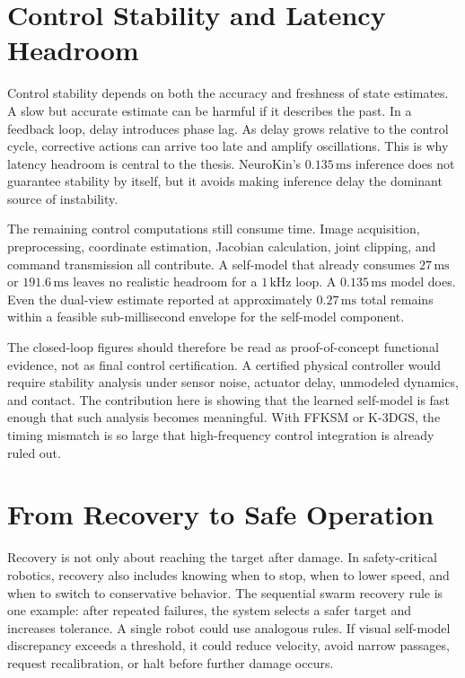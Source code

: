 \documentclass[12pt,a4paper,oneside]{report}
\begin{document}
\section{Control Stability and Latency Headroom}

Control stability depends on both the accuracy and freshness of state estimates. A slow but accurate estimate can be harmful if it describes the past. In a feedback loop, delay introduces phase lag. As delay grows relative to the control cycle, corrective actions can arrive too late and amplify oscillations. This is why latency headroom is central to the thesis. NeuroKin's $0.135\,\mathrm{ms}$ inference does not guarantee stability by itself, but it avoids making inference delay the dominant source of instability.

The remaining control computations still consume time. Image acquisition, preprocessing, coordinate estimation, Jacobian calculation, joint clipping, and command transmission all contribute. A self-model that already consumes $27\,\mathrm{ms}$ or $191.6\,\mathrm{ms}$ leaves no realistic headroom for a $1\,\mathrm{kHz}$ loop. A $0.135\,\mathrm{ms}$ model does. Even the dual-view estimate reported at approximately $0.27\,\mathrm{ms}$ total remains within a feasible sub-millisecond envelope for the self-model component.

The closed-loop figures should therefore be read as proof-of-concept functional evidence, not as final control certification. A certified physical controller would require stability analysis under sensor noise, actuator delay, unmodeled dynamics, and contact. The contribution here is showing that the learned self-model is fast enough that such analysis becomes meaningful. With FFKSM or K-3DGS, the timing mismatch is so large that high-frequency control integration is already ruled out.

\section{From Recovery to Safe Operation}

Recovery is not only about reaching the target after damage. In safety-critical robotics, recovery also includes knowing when to stop, when to lower speed, and when to switch to conservative behavior. The sequential swarm recovery rule is one example: after repeated failures, the system selects a safer target and increases tolerance. A single robot could use analogous rules. If visual self-model discrepancy exceeds a threshold, it could reduce velocity, avoid narrow passages, request recalibration, or halt before further damage occurs.
\end{document}
